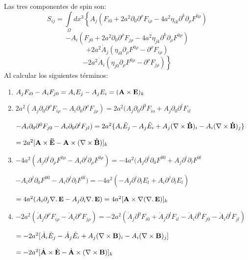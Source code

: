 \documentclass[a4paper,12pt]{article}
\begin{document}
Las tres componentes de spin son:
\begin{equation}
S_{ij}=\int\limits_{\Omega}dx^{3}\left\{A_j(F_{i0}+2a^2\partial_0\partial^\rho F_{i\rho}-4a^2\eta_{i k}\partial^k\partial_\rho F^{0\rho})   \right.
\end{equation}
$$\left.-A_i(F_{j0}+2a^2\partial_0\partial^\rho F_{j\rho}-4a^2\eta_{j k}\partial^k\partial_\rho F^{0\rho})\right.$$
\vspace{0,05cm}
$$\left.+2a^2\dot A_j(\eta_{i0}\partial_\rho F^{0\rho}-\partial^\rho F_{i\rho})\right.$$
\vspace{0,05cm}
$$\left.-2a^2\dot A_i(\eta_{j0}\partial_\rho F^{0\rho}-\partial^\rho F_{j\rho})\right\}$$
Al calcular los siguientes términos:
\begin{enumerate}
\item[\fbox{1.}] $A_jF_{i0}-A_iF_{j0}=A_iE_j-A_jE_i=({\bf A}\times{\bf E})_k$
\item[\fbox{2.}] $2a^2(A_j\partial_0\partial^\rho F_{i\rho}-A_i\partial_0\partial^\rho F_{j\rho})=2a^2(A_j\partial_0\partial^0 F_{io}+A_j\partial_0\partial^l F_{il}$ 
\vspace{0,1cm}

$-A_i\partial_0\partial^0 F_{j0}-A_i\partial_0\partial^l F_{jl})=2a^2\{A_i\ddot E_j-A_j\ddot E_i+A_j(\nabla \times {\bf \dot B})_i-A_i(\nabla \times {\bf \dot B})_j\}$
\vspace{0,1cm}

$=2a^2[{\bf A}\times{\bf \ddot E}-{\bf A}\times(\nabla\times {\bf \dot B})]_k$
\item[\fbox{3.}] $-4a^2(A_j\partial^i\partial_\rho F^{0\rho}-A_i\partial^j\partial_\rho F^{0\rho})=-4a^2(A_j\partial^i\partial_0 F^{00}+A_j\partial^i\partial_l F^{0l}$
\vspace{0,1cm}

$-A_i\partial^j\partial_0 F^{00}-A_i\partial^j\partial_l F^{0l})=-4a^2(-A_j\partial^i\partial_l E_{l}+A_i\partial^j\partial_l E_{l})$
\vspace{0,1cm}

$=4a^2(A_i\partial_j\nabla\ldotp{\bf E}-A_j\partial_i\nabla\ldotp{\bf E})=4a^2[{\bf A}\times\nabla(\nabla\ldotp{\bf E})]_k$
\item[\fbox{4.}] $-2a^2(\dot A_j\partial^\rho F_{i\rho}-\dot A_i\partial^\rho F_{j\rho})=-2a^2(\dot A_j\partial^0 F_{i0}+\dot A_j\partial^l F_{il}-\dot A_i\partial^0 F_{j0}-\dot A_i\partial^l F_{jl})$
\vspace{0,1cm}

$=-2a^2[\dot A_i\dot E_j-\dot A_j\dot E_i+A_j(\nabla\times{\bf B})_i-A_i(\nabla\times{\bf B})_j]$
\vspace{0,1cm}

$=-2a^2[\dot{{\bf A}}\times\dot{{\bf E}}-\dot{{\bf A}}\times(\nabla\times{\bf B})]_k$
\end{enumerate}
\end{document}
